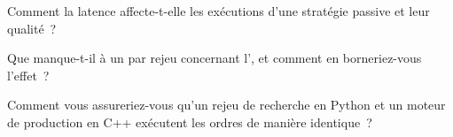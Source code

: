 \begin{interviewq}\label{iq:rs:order-book-replay-simulation:4}
Comment la latence affecte-t-elle les exécutions d'une stratégie passive et leur qualité~?
\end{interviewq}

\begin{interviewq}\label{iq:rs:order-book-replay-simulation:5}
Que manque-t-il à un  par rejeu concernant l', et comment en borneriez-vous l'effet~?
\end{interviewq}

\begin{interviewq}\label{iq:rs:order-book-replay-simulation:6}
Comment vous assureriez-vous qu'un rejeu de recherche en Python et un moteur de production en C++ exécutent les ordres de manière identique~?
\end{interviewq}
